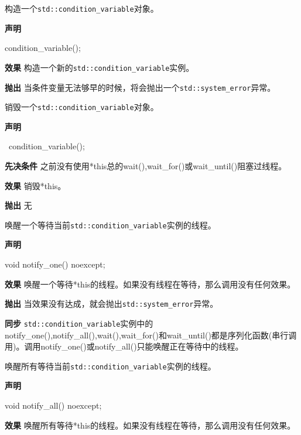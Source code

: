 
构造一个\texttt{std::condition\_variable}对象。

\textbf{声明}

\begin{cpp}
condition_variable();
\end{cpp}

\textbf{效果}
构造一个新的\texttt{std::condition\_variable}实例。

\textbf{抛出}
当条件变量无法够早的时候，将会抛出一个\texttt{std::system\_error}异常。


销毁一个\texttt{std::condition\_variable}对象。

\textbf{声明}

\begin{cpp}
~condition_variable();
\end{cpp}

\textbf{先决条件}
之前没有使用*this总的wait(),wait\_for()或wait\_until()阻塞过线程。

\textbf{效果}
销毁*this。

\textbf{抛出}
无


唤醒一个等待当前\texttt{std::condition\_variable}实例的线程。

\textbf{声明}

\begin{cpp}
void notify_one() noexcept;
\end{cpp}

\textbf{效果}
唤醒一个等待*this的线程。如果没有线程在等待，那么调用没有任何效果。

\textbf{抛出}
当效果没有达成，就会抛出\texttt{std::system\_error}异常。

\textbf{同步}
\texttt{std::condition\_variable}实例中的notify\_one(),notify\_all(),wait(),wait\_for()和wait\_until()都是序列化函数(串行调用)。调用notify\_one()或notify\_all()只能唤醒正在等待中的线程。


唤醒所有等待当前\texttt{std::condition\_variable}实例的线程。

\textbf{声明}

\begin{cpp}
void notify_all() noexcept;
\end{cpp}

\textbf{效果}
唤醒所有等待*this的线程。如果没有线程在等待，那么调用没有任何效果。

